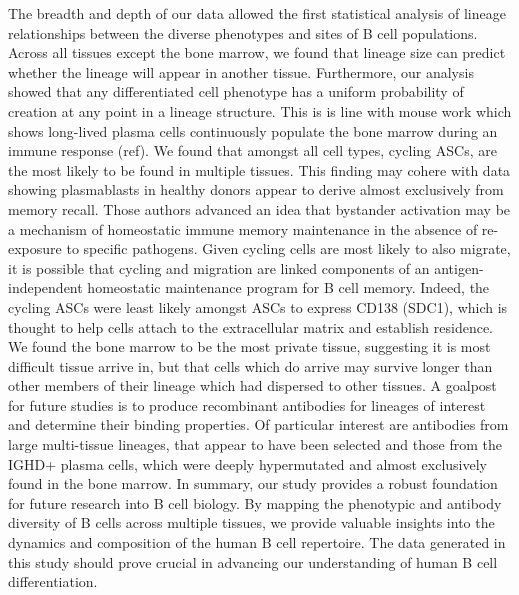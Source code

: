 The breadth and depth of our data allowed the first statistical analysis of lineage relationships between the diverse phenotypes and sites of B cell populations. Across all tissues except the bone marrow, we found that lineage size can predict whether the lineage will appear in another tissue. Furthermore, our analysis showed that any differentiated cell phenotype has a uniform probability of creation at any point in a lineage structure. This is is line with mouse work which shows long-lived plasma cells continuously populate the bone marrow during an immune response (ref). We found that amongst all cell types, cycling ASCs, are the most likely to be found in multiple tissues. This finding may cohere with data showing plasmablasts in healthy donors appear to derive almost exclusively from memory recall\cite{phad_lanza_2022clonal}. Those authors advanced an idea that bystander activation may be a mechanism of homeostatic immune memory maintenance in the absence of re-exposure to specific pathogens. Given cycling cells are most likely to also migrate, it is possible that cycling and migration are linked components of an antigen-independent homeostatic maintenance program for B cell memory. Indeed, the cycling ASCs were least likely amongst ASCs to express CD138 (SDC1), which is thought to help cells attach to the extracellular matrix and establish residence. We found the bone marrow to be the most private tissue, suggesting it is most difficult tissue arrive in, but that cells which do arrive may survive longer than other members of their lineage which had dispersed to other tissues.  
A goalpost for future studies is to produce recombinant antibodies for lineages of interest and determine their binding properties. Of particular interest are antibodies from large multi-tissue lineages, that appear to have been selected\cite{neher2014predicting} and those from the IGHD+ plasma cells, which were deeply hypermutated and almost exclusively found in the bone marrow.
In summary, our study provides a robust foundation for future research into B cell biology. By mapping the phenotypic and antibody diversity of B cells across multiple tissues, we provide valuable insights into the dynamics and composition of the human B cell repertoire. The data generated in this study should prove crucial in advancing our understanding of human B cell differentiation.


